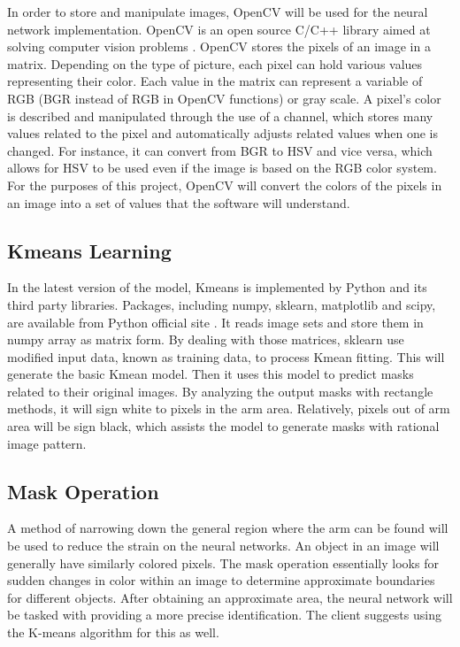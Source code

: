 \documentclass[10pt,journal,compsoc, draftclsnofoot,onecolumn]{IEEEtran}
\begin{document}
In order to store and manipulate images, OpenCV will be used for the neural network implementation.
OpenCV is an open source C/C++ library aimed at solving computer vision problems \cite{1:online}.
OpenCV stores the pixels of an image in a matrix.
Depending on the type of picture, each pixel can hold various values representing their color.
Each value in the matrix can represent a variable of RGB (BGR instead of RGB in OpenCV functions) or gray scale.
A pixel's color is described and manipulated through the use of a channel, which stores many values related to the pixel and automatically adjusts related values when one is changed.
For instance, it can convert from BGR to HSV and vice versa, which allows for HSV to be used even if the image is based on the RGB color system.
For the purposes of this project, OpenCV will convert the colors of the pixels in an image into a set of values that the software will understand.

\subsection{Kmeans Learning}
In the latest version of the model, Kmeans is implemented by Python and its third party libraries. Packages, including numpy, sklearn, matplotlib and scipy, are available from Python official site \cite{4:online}. It reads image sets and store them in numpy array as matrix form. By dealing with those matrices, sklearn use modified input data, known as training data, to process Kmean fitting. This will generate the basic Kmean model. Then it uses this model to predict masks related to their original images. By analyzing the output masks with rectangle methods, it will sign white to pixels in the arm area. Relatively, pixels out of arm area will be sign black, which assists the model to generate masks with rational image pattern. 

\subsection{Mask Operation}
A method of narrowing down the general region where the arm can be found will be used to reduce the strain on the neural networks.
An object in an image will generally have similarly colored pixels.
The mask operation essentially looks for sudden changes in color within an image to determine approximate boundaries for different objects.
After obtaining an approximate area, the neural network will be tasked with providing a more precise identification.
The client suggests using the K-means algorithm for this as well.
\end{document}
